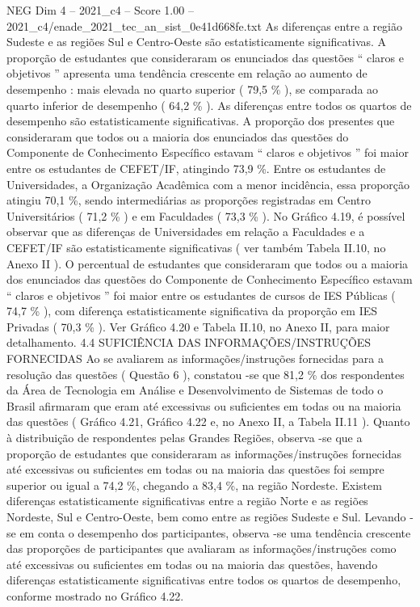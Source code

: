 \begin{textsample}{NEG Dim 4 – 2021\_c4 – Score 1.00 – 2021\_c4/enade\_2021\_tec\_an\_sist\_0e41d668fe.txt}
As diferenças entre a região Sudeste e as regiões Sul e Centro-Oeste são estatisticamente significativas.
A proporção de estudantes que consideraram os enunciados das questões “ claros e objetivos ” apresenta uma tendência crescente em relação ao aumento de desempenho : mais elevada no quarto superior ( 79,5 \% ), se comparada ao quarto inferior de desempenho ( 64,2 \% ).
As diferenças entre todos os quartos de desempenho são estatisticamente significativas.
A proporção dos presentes que consideraram que todos ou a maioria dos enunciados das questões do Componente de Conhecimento Específico estavam “ claros e objetivos ” foi maior entre os estudantes de CEFET/IF, atingindo 73,9 \%.
Entre os estudantes de Universidades, a Organização Acadêmica com a menor incidência, essa proporção atingiu 70,1 \%, sendo intermediárias as proporções registradas em Centro Universitários ( 71,2 \% ) e em Faculdades ( 73,3 \% ).
No Gráfico 4.19, é possível observar que as diferenças de Universidades em relação a Faculdades e a CEFET/IF são estatisticamente significativas ( ver também Tabela II.10, no Anexo II ).
O percentual de estudantes que consideraram que todos ou a maioria dos enunciados das questões do Componente de Conhecimento Específico estavam “ claros e objetivos ” foi maior entre os estudantes de cursos de IES Públicas ( 74,7 \% ), com diferença estatisticamente significativa da proporção em IES Privadas ( 70,3 \% ).
Ver Gráfico 4.20 e Tabela II.10, no Anexo II, para maior detalhamento. 4.4 SUFICIÊNCIA DAS INFORMAÇÕES/INSTRUÇÕES FORNECIDAS Ao se avaliarem as informações/instruções fornecidas para a resolução das questões ( Questão 6 ), constatou -se que 81,2 \% dos respondentes da Área de Tecnologia em Análise e Desenvolvimento de Sistemas de todo o Brasil afirmaram que eram até excessivas ou suficientes em todas ou na maioria das questões ( Gráfico 4.21, Gráfico 4.22 e, no Anexo II, a Tabela II.11 ).
Quanto à distribuição de respondentes pelas Grandes Regiões, observa -se que a proporção de estudantes que consideraram as informações/instruções fornecidas até excessivas ou suficientes em todas ou na maioria das questões foi sempre superior ou igual a 74,2 \%, chegando a 83,4 \%, na região Nordeste.
Existem diferenças estatisticamente significativas entre a região Norte e as regiões Nordeste, Sul e Centro-Oeste, bem como entre as regiões Sudeste e Sul.
Levando -se em conta o desempenho dos participantes, observa -se uma tendência crescente das proporções de participantes que avaliaram as informações/instruções como até excessivas ou suficientes em todas ou na maioria das questões, havendo diferenças estatisticamente significativas entre todos os quartos de desempenho, conforme mostrado no Gráfico 4.22.

\end{textsample}
